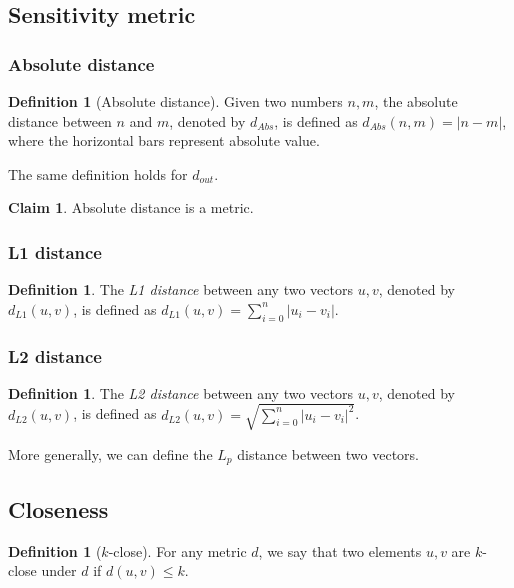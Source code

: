 \documentclass[11pt,a4paper]{article}
\theoremstyle{definition}
\newtheorem{definition}[theorem]{Definition}
\newtheorem{claim}{Claim}
\newcommand{\dout}{d_{out}}
\begin{document}
\subsection{Sensitivity metric}
\subsubsection{Absolute distance}

\begin{definition}[Absolute distance]\label{def:abs}
    Given two numbers $n, m$, the absolute distance between $n$ and $m$, denoted by $d_{Abs}$, is defined as $d_{Abs}(n, m)= |n-m|$, where the horizontal bars represent absolute value.
\end{definition}

The same definition holds for $\dout$.

\begin{claim}
    Absolute distance is a metric.
\end{claim}

\subsubsection{L1 distance}
\begin{definition}
\label{def:l1-dist}
    The \textit{L1 distance} between any two vectors $u, v$, denoted by $d_{L1}(u, v)$, is defined as $d_{L1}(u, v) = \sum_{i=0}^n |u_i - v_i|$.
\end{definition}

\subsubsection{L2 distance}
\begin{definition}
    The \textit{L2 distance} between any two vectors $u, v$, denoted by $d_{L2}(u, v)$, is defined as $d_{L2}(u, v) = \sqrt{\sum_{i=0}^n |u_i - v_i|^2}$.
\end{definition}

More generally, we can define the $L_p$ distance between two vectors.

\subsection{Closeness}
\begin{definition}[$k$-close]
For any metric $d$, we say that two elements $u, v$ are $k$-close under $d$ if $d(u, v) \leq k$.
\end{definition}
\end{document}
